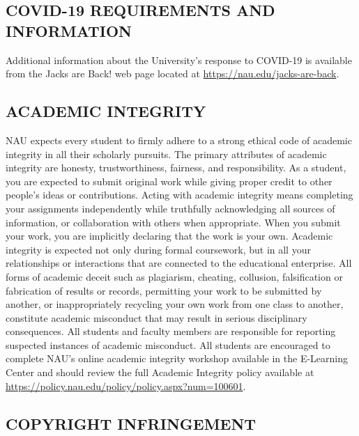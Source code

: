 \documentclass[
  letterpaper,
  DIV=11,
  numbers=noendperiod]{scrreprt}
\begin{document}
\hypertarget{covid-19-requirements-and-information}{%
\subsection{COVID-19 REQUIREMENTS AND
INFORMATION}\label{covid-19-requirements-and-information}}

Additional information about the University's response to COVID-19 is
available from the Jacks are Back! web page located at
\url{https://nau.edu/jacks-are-back}.

\hypertarget{academic-integrity}{%
\subsection{ACADEMIC INTEGRITY}\label{academic-integrity}}

NAU expects every student to firmly adhere to a strong ethical code of
academic integrity in all their scholarly pursuits. The primary
attributes of academic integrity are honesty, trustworthiness, fairness,
and responsibility. As a student, you are expected to submit original
work while giving proper credit to other people's ideas or
contributions. Acting with academic integrity means completing your
assignments independently while truthfully acknowledging all sources of
information, or collaboration with others when appropriate. When you
submit your work, you are implicitly declaring that the work is your
own. Academic integrity is expected not only during formal coursework,
but in all your relationships or interactions that are connected to the
educational enterprise. All forms of academic deceit such as plagiarism,
cheating, collusion, falsification or fabrication of results or records,
permitting your work to be submitted by another, or inappropriately
recycling your own work from one class to another, constitute academic
misconduct that may result in serious disciplinary consequences. All
students and faculty members are responsible for reporting suspected
instances of academic misconduct. All students are encouraged to
complete NAU's online academic integrity workshop available in the
E-Learning Center and should review the full Academic Integrity policy
available at \url{https://policy.nau.edu/policy/policy.aspx?num=100601}.

\hypertarget{copyright-infringement}{%
\subsection{COPYRIGHT INFRINGEMENT}\label{copyright-infringement}}
\end{document}

